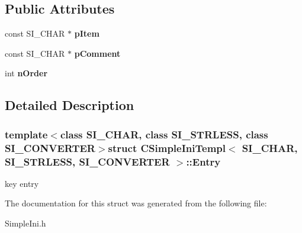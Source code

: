 \subsection*{Public Attributes}
\begin{DoxyCompactItemize}
\item 
\hypertarget{a00015_a0f987914bf6076156c2a7c40e8e09c89}{}const S\+I\+\_\+\+C\+H\+A\+R $\ast$ {\bfseries p\+Item}\label{a00015_a0f987914bf6076156c2a7c40e8e09c89}

\item 
\hypertarget{a00015_a84364bcded2d32c5ae4241bf197a74c4}{}const S\+I\+\_\+\+C\+H\+A\+R $\ast$ {\bfseries p\+Comment}\label{a00015_a84364bcded2d32c5ae4241bf197a74c4}

\item 
\hypertarget{a00015_ac08ed1fec5743b35aebfa8635e1bdb5a}{}int {\bfseries n\+Order}\label{a00015_ac08ed1fec5743b35aebfa8635e1bdb5a}

\end{DoxyCompactItemize}


\subsection{Detailed Description}
\subsubsection*{template$<$class S\+I\+\_\+\+C\+H\+A\+R, class S\+I\+\_\+\+S\+T\+R\+L\+E\+S\+S, class S\+I\+\_\+\+C\+O\+N\+V\+E\+R\+T\+E\+R$>$struct C\+Simple\+Ini\+Templ$<$ S\+I\+\_\+\+C\+H\+A\+R, S\+I\+\_\+\+S\+T\+R\+L\+E\+S\+S, S\+I\+\_\+\+C\+O\+N\+V\+E\+R\+T\+E\+R $>$\+::\+Entry}

key entry 

The documentation for this struct was generated from the following file\+:\begin{DoxyCompactItemize}
\item 
Simple\+Ini.\+h\end{DoxyCompactItemize}
